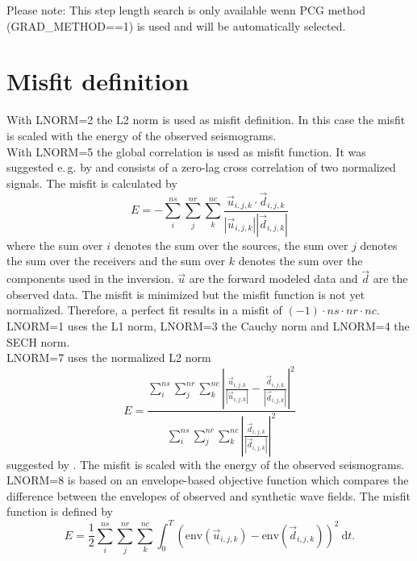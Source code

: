 Please note: This step length search is only available wenn PCG method (GRAD\_METHOD==1) is used and will be automatically selected.


\section{Misfit definition}
{\color{blue}{\begin{verbatim}
"Misfit Definition" : "comment",
			"LNORM" : "2",
			"NORMALIZE" : "0",
			"DTINV" : "2",
			"WATERLEVEL_LNORM8" : "0.0",
\end{verbatim}}}

With LNORM=2 the L2 norm is used as misfit definition. In this case the misfit is scaled with the energy of the observed seismograms.\\
With LNORM=5 the global correlation is used as misfit function. It was suggested e.\,g. by \cite{choi:2012} and consists of a zero-lag cross correlation of two normalized signals. The misfit is calculated by
\begin{equation}
E = - \sum_i^{ns} \sum_j^{nr} \sum_k^{nc} \frac{\vec{u}_{i,j,k} \cdot \vec{d}_{i,j,k}}{|\vec{u}_{i,j,k}| |\vec{d}_{i,j,k}|}
\end{equation}
where the sum over $i$ denotes the sum over the sources, the sum over $j$ denotes the sum over the receivers and the sum over $k$ denotes the sum over the components used in the inversion. $\vec{u}$ are the forward modeled data and $\vec{d}$ are the observed data. The misfit is minimized but the misfit function is not yet normalized. Therefore, a perfect fit results in a misfit of $(-1)\cdot ns \cdot nr \cdot nc$.\\
LNORM=1 uses the L1 norm, LNORM=3 the Cauchy norm and LNORM=4 the SECH norm.\\
LNORM=7 uses the normalized L2 norm
\begin{equation}
 E=\frac{\sum_i^{ns} \sum_j^{nr} \sum_k^{nc} \left| \frac{\vec{u}_{i,j,k}}{|\vec{u}_{i,j,k}|}-\frac{\vec{d}_{i,j,k}}{|\vec{d}_{i,j,k}|}\right|^2}{\sum_i^{ns} \sum_j^{nr} \sum_k^{nc} \left| \frac{\vec{d}_{i,j,k}}{|\vec{d}_{i,j,k}|}\right|^2}
\end{equation}
 suggested by \cite{choi:2012}. The misfit is scaled with the energy of the observed seismograms.\\ 
LNORM=8 is based on an envelope-based objective function which compares the difference between the envelopes of observed and synthetic wave fields.
The misfit function is defined by
\begin{equation}
E= \frac{1}{2} \sum_i^{ns} \sum_j^{nr} \sum_k^{nc} \int_0^T \left( \text{env}(\vec{u}_{i,j,k}) - \text{env}(\vec{d}_{i,j,k}) \right)^2~\text{d}t.
\label{misfit_envelope}
\end{equation}
